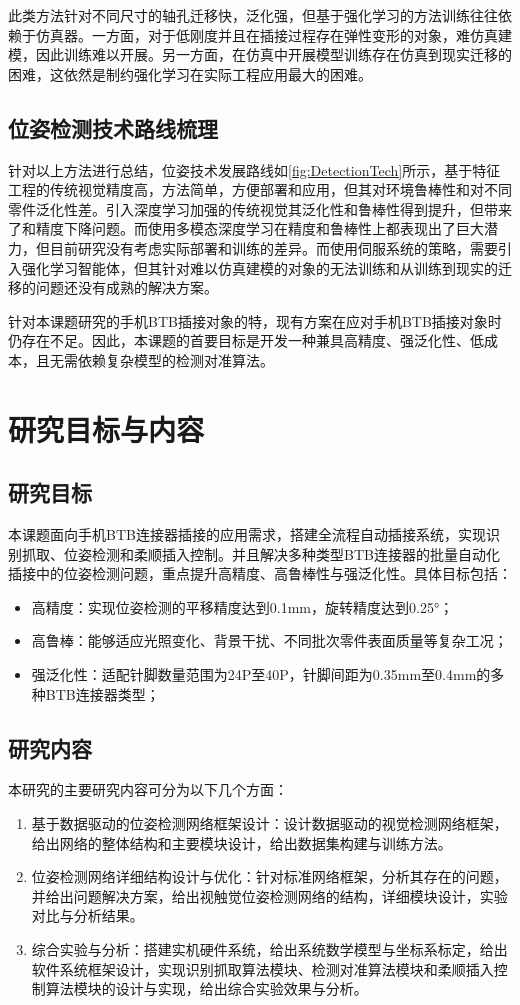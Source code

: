 \documentclass{Diploma}
\begin{document}
此类方法针对不同尺寸的轴孔迁移快，泛化强，但基于强化学习的方法训练往往依赖于仿真器。一方面，对于低刚度并且在插接过程存在弹性变形的对象，难仿真建模，因此训练难以开展。另一方面，在仿真中开展模型训练存在仿真到现实迁移的困难，这依然是制约强化学习在实际工程应用最大的困难。
\subsection{位姿检测技术路线梳理}
针对以上方法进行总结，位姿技术发展路线如\ref{fig:DetectionTech}所示，基于特征工程的传统视觉精度高，方法简单，方便部署和应用，但其对环境鲁棒性和对不同零件泛化性差。引入深度学习加强的传统视觉其泛化性和鲁棒性得到提升，但带来了和精度下降问题。而使用多模态深度学习在精度和鲁棒性上都表现出了巨大潜力，但目前研究没有考虑实际部署和训练的差异。而使用伺服系统的策略，需要引入强化学习智能体，但其针对难以仿真建模的对象的无法训练和从训练到现实的迁移的问题还没有成熟的解决方案。

针对本课题研究的手机BTB插接对象的特，现有方案在应对手机BTB插接对象时仍存在不足。因此，本课题的首要目标是开发一种兼具高精度、强泛化性、低成本，且无需依赖复杂模型的检测对准算法。
\section{研究目标与内容}
\subsection{研究目标}
本课题面向手机BTB连接器插接的应用需求，搭建全流程自动插接系统，实现识别抓取、位姿检测和柔顺插入控制。并且解决多种类型BTB连接器的批量自动化插接中的位姿检测问题，重点提升高精度、高鲁棒性与强泛化性。具体目标包括：
\begin{itemize}
  \item 高精度：实现位姿检测的平移精度达到0.1mm，旋转精度达到0.25°； 
  \item 高鲁棒：能够适应光照变化、背景干扰、不同批次零件表面质量等复杂工况；
  \item 强泛化性：适配针脚数量范围为24P至40P，针脚间距为0.35mm至0.4mm的多种BTB连接器类型； 
\end{itemize}
\subsection{研究内容}
本研究的主要研究内容可分为以下几个方面：
\begin{enumerate} 
  \item 基于数据驱动的位姿检测网络框架设计：设计数据驱动的视觉检测网络框架，给出网络的整体结构和主要模块设计，给出数据集构建与训练方法。
  \item 位姿检测网络详细结构设计与优化：针对标准网络框架，分析其存在的问题，并给出问题解决方案，给出视触觉位姿检测网络的结构，详细模块设计，实验对比与分析结果。
  \item 综合实验与分析：搭建实机硬件系统，给出系统数学模型与坐标系标定，给出软件系统框架设计，实现识别抓取算法模块、检测对准算法模块和柔顺插入控制算法模块的设计与实现，给出综合实验效果与分析。
\end{enumerate}
\end{document}
